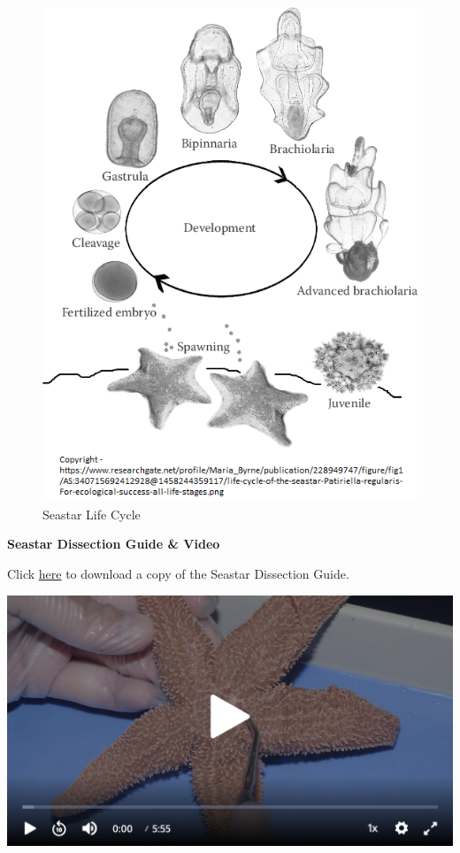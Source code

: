 \documentclass[
]{book}
\begin{document}
\begin{figure}
\centering
\includegraphics{images/Lab8_seastar_life_cycle.png}
\caption{Seastar Life Cycle}
\end{figure}

\textbf{Seastar Dissection Guide \& Video}

Click \href{files/Lab8_seastar_dissection_guide.pdf}{here} to download a copy of the Seastar Dissection Guide.

\includegraphics{images/Lab8_Seastar_Dissection_Video1.png}
\end{document}
